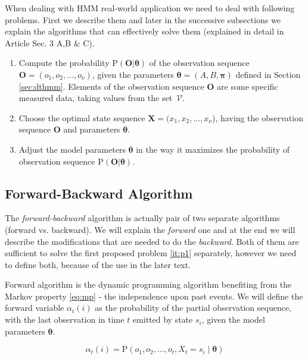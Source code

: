 \documentclass[thesis=M,english]{FITthesis}[2012/10/20]
\newcommand{\matr}[1]{\mathbf{#1}}
\begin{document}
When dealing with HMM real-world application we need to deal with following problems. First we describe them and later in the successive subsections we explain the algorithms that can effectively solve them (explained in detail in Article \cite{Ra89} Sec. 3 A,B \& C). 

\begin{enumerate}
\item Compute the probability $\mathrm{P}(\matr{O}|\boldsymbol{\theta}) $ of the observation sequence \\ $\matr{O} = (o_1,o_2,\dots,o_{\nu})$, given the parameters $\boldsymbol{\theta} = (A,B,\boldsymbol\pi)$ defined in  Section \ref{sec:dthmm}. Elements of the observation sequence $\matr{O}$ are some specific measured data, taking values from the set~$\mathcal{V}$. \label{it:p1}  
\item Choose the optimal state sequence $\matr{X} = (x_1,x_2,\dots,x_{\nu}$), having the observation sequence $\matr{O}$ and parameters $\boldsymbol{\theta}$. \label{it:p2} 
\item Adjust the model parameters $\boldsymbol{\theta}$ in the way it maximizes the probability of observation sequence $ \mathrm{P}(\matr{O}|\boldsymbol{\theta}) $. \label{it:p3} 
\end{enumerate}


\subsection{Forward-Backward Algorithm}\label{sec:fb}
The \textit{forward-backward} algorithm is actually pair of two separate algorithms (forward vs. backward). We will explain the \textit{forward} one and at the end we will describe the modifications that are needed to do the \textit{backward}. Both of them are sufficient to solve the first proposed problem \ref{it:p1} separately, however we need to define both, because of the use in the later text.  

Forward algorithm is the dynamic programming algorithm benefiting from the Markov property \eqref{eq:mp} - the independence upon past events. We will define the forward variable $\alpha_t(i)$ as the probability of the partial observation sequence, with the last observation in time $t$ emitted by state $s_i$, given the model parameters $\boldsymbol{\theta}$.

\begin{equation}
\alpha_t(i) = \mathrm{P}(o_1,o_2,\dots,o_t,X_t = s_i \mid \boldsymbol{\theta} )
\end{equation}
\end{document}
